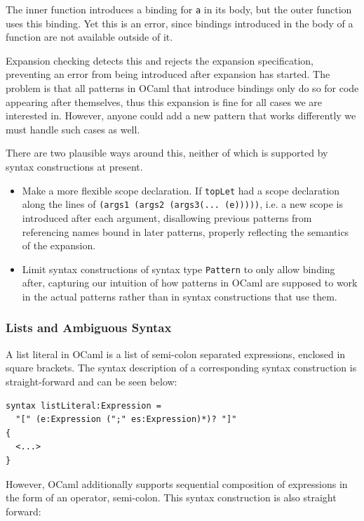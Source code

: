 \documentclass{kththesis}
\begin{document}
The inner function introduces a binding for \texttt{a} in its body, but the outer function uses this binding. Yet this is an error, since bindings introduced in the body of a function are not available outside of it.

Expansion checking detects this and rejects the expansion specification, preventing an error from being introduced after expansion has started. The problem is that all patterns in OCaml that introduce bindings only do so for code appearing after themselves, thus this expansion is fine for all cases we are interested in. However, anyone could add a new pattern that works differently we must handle such cases as well.

There are two plausible ways around this, neither of which is supported by syntax constructions at present.
\begin{itemize}
  \item Make a more flexible scope declaration. If \texttt{topLet} had a scope declaration along the lines of \texttt{(args1 (args2 (args3(... (e)))))}, i.e. a new scope is introduced after each argument, disallowing previous patterns from referencing names bound in later patterns, properly reflecting the semantics of the expansion.

  \item Limit syntax constructions of syntax type \texttt{Pattern} to only allow binding after, capturing our intuition of how patterns in OCaml are supposed to work in the actual patterns rather than in syntax constructions that use them.
\end{itemize}

\subsubsection{Lists and Ambiguous Syntax} \label{sec:ambiguous-lists}

A list literal in OCaml is a list of semi-colon separated expressions, enclosed in square brackets. The syntax description of a corresponding syntax construction is straight-forward and can be seen below:

\begin{verbatim}
syntax listLiteral:Expression =
  "[" (e:Expression (";" es:Expression)*)? "]"
{
  <...>
}
\end{verbatim}

However, OCaml additionally supports sequential composition of expressions in the form of an operator, semi-colon. This syntax construction is also straight forward:
\end{document}
